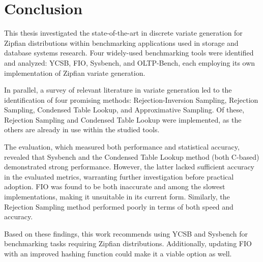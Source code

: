 \chapter{Conclusion}\label{chapter:conclusion}

This thesis investigated the state-of-the-art in discrete variate generation for Zipfian distributions within benchmarking applications used in storage and database systems research.
 Four widely-used benchmarking tools were identified and analyzed: YCSB, FIO, Sysbench, and OLTP-Bench, each employing its own implementation of Zipfian variate generation.

In parallel, a survey of relevant literature in variate generation led to the identification of four promising methods: 
Rejection-Inversion Sampling, Rejection Sampling, Condensed Table Lookup, and Approximative Sampling. 
Of these, Rejection Sampling and Condensed Table Lookup were implemented, as the others are already in use within the studied tools.

The evaluation, which measured both performance and statistical accuracy, revealed that Sysbench and the 
Condensed Table Lookup method (both C-based) demonstrated strong performance. However, the latter lacked 
sufficient accuracy in the evaluated metrics, warranting further investigation before practical adoption. 
FIO was found to be both inaccurate and among the slowest implementations, making it unsuitable in its current form. 
Similarly, the Rejection Sampling method performed poorly in terms of both speed and accuracy. 

Based on these findings, this work recommends using YCSB and Sysbench 
for benchmarking tasks requiring Zipfian distributions. Additionally, 
updating FIO with an improved hashing function could make it a viable option as well.
